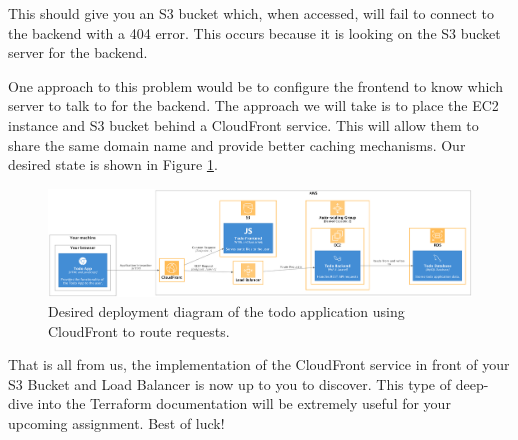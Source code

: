 \documentclass{csse4400}
\begin{document}
This should give you an S3 bucket which, when accessed,
will fail to connect to the backend with a 404 error.
This occurs because it is looking on the S3 bucket server for the backend.

One approach to this problem would be to configure the frontend to know which server to talk to for the backend.
The approach we will take is to place the EC2 instance and S3 bucket behind a CloudFront service.
This will allow them to share the same domain name and provide better caching mechanisms.
Our desired state is shown in Figure \ref{fig:s3deployment}.

\begin{figure}[ht]
\includegraphics[width=\textwidth]{diagrams/S3Deployment}
\caption{Desired deployment diagram of the todo application using CloudFront to route requests.}
\label{fig:s3deployment}
\end{figure}

That is all from us,
the implementation of the CloudFront service in front of your S3 Bucket and Load Balancer is now up to you to discover.
This type of deep-dive into the Terraform documentation will be extremely useful for your upcoming assignment.
Best of luck!



\end{document}
